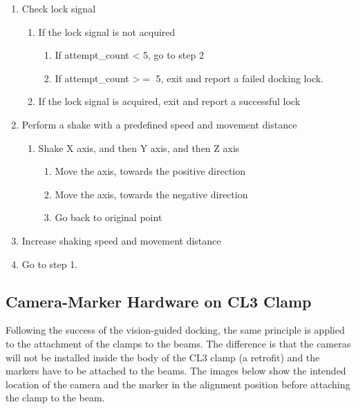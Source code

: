 \begin{enumerate}
	\item Check lock signal

\begin{enumerate}
	\item If the lock signal is not acquired

\begin{enumerate}
	\item If attempt\_count < 5, go to step 2

	\item If attempt\_count >$=$ 5, exit and report a failed docking lock.

\end{enumerate}
	\item If the lock signal is acquired, exit and report a successful lock

\end{enumerate}
	\item Perform a shake with a predefined speed and movement distance

\begin{enumerate}
	\item Shake X axis, and then Y axis, and then Z axis

\begin{enumerate}
	\item Move the axis, towards the positive direction

	\item Move the axis, towards the negative direction

	\item Go back to original point

\end{enumerate}
\end{enumerate}
	\item Increase shaking speed and movement distance

	\item Go to step 1.

\end{enumerate}
\subsection{Camera-Marker Hardware on CL3 Clamp}
\label{subsection:exploration_5_camera_marker_hardware_on_cl3_clamp}

Following the success of the vision-guided docking, the same principle is applied to the attachment of the clamps to the beams. The difference is that the cameras will not be installed inside the body of the CL3 clamp (a retrofit) and the markers have to be attached to the beams. The images below show the intended location of the camera and the marker in the alignment position before attaching the clamp to the beam.

